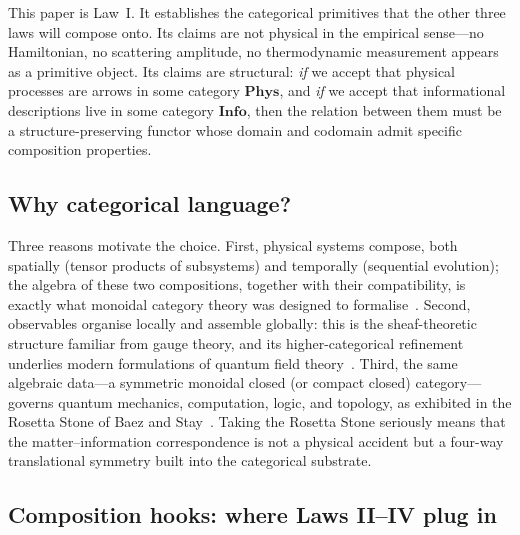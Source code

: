 \documentclass[12pt]{article}
\theoremstyle{definition}
\theoremstyle{remark}
\newcommand{\Phys}{\mathbf{Phys}}
\newcommand{\Info}{\mathbf{Info}}
\begin{document}
This paper is Law~I. It establishes the categorical primitives that the other three laws will compose onto. Its claims are not physical in the empirical sense---no Hamiltonian, no scattering amplitude, no thermodynamic measurement appears as a primitive object. Its claims are structural: \emph{if} we accept that physical processes are arrows in some category $\Phys$, and \emph{if} we accept that informational descriptions live in some category $\Info$, then the relation between them must be a structure-preserving functor whose domain and codomain admit specific composition properties.

\subsection{Why categorical language?}

Three reasons motivate the choice. First, physical systems compose, both spatially (tensor products of subsystems) and temporally (sequential evolution); the algebra of these two compositions, together with their compatibility, is exactly what monoidal category theory was designed to formalise~\cite{maclane1998}. Second, observables organise locally and assemble globally: this is the sheaf-theoretic structure familiar from gauge theory, and its higher-categorical refinement underlies modern formulations of quantum field theory~\cite{costello2017}. Third, the same algebraic data---a symmetric monoidal closed (or compact closed) category---governs quantum mechanics, computation, logic, and topology, as exhibited in the Rosetta Stone of Baez and Stay~\cite{baezstay2009}. Taking the Rosetta Stone seriously means that the matter--information correspondence is not a physical accident but a four-way translational symmetry built into the categorical substrate.

\subsection{Composition hooks: where Laws II--IV plug in}
\end{document}
